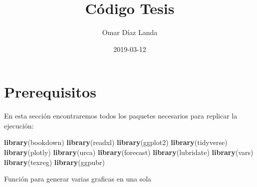 \documentclass[]{book}
\title{Código Tesis}
\author{Omar Díaz Landa}
\date{2019-03-12}
\newenvironment{Shaded}{\begin{snugshade}}{\end{snugshade}}
\newcommand{\KeywordTok}[1]{\textcolor[rgb]{0.13,0.29,0.53}{\textbf{#1}}}
\newcommand{\NormalTok}[1]{#1}
\theoremstyle{definition}
\theoremstyle{definition}
\theoremstyle{definition}
\theoremstyle{remark}
\begin{document}
\maketitle

{
\setcounter{tocdepth}{1}
\tableofcontents
}
\chapter{Prerequisitos}\label{prerequisitos}

En esta sección encontraremos todos los paquetes necesarios para
replicar la ejecución:

\begin{Shaded}
\begin{Highlighting}[]
\KeywordTok{library}\NormalTok{(bookdown)}
\KeywordTok{library}\NormalTok{(readxl)}
\KeywordTok{library}\NormalTok{(ggplot2)}
\KeywordTok{library}\NormalTok{(tidyverse)}
\KeywordTok{library}\NormalTok{(plotly)}
\KeywordTok{library}\NormalTok{(urca)}
\KeywordTok{library}\NormalTok{(forecast)}
\KeywordTok{library}\NormalTok{(lubridate)}
\KeywordTok{library}\NormalTok{(vars)}
\KeywordTok{library}\NormalTok{(texreg)}
\KeywordTok{library}\NormalTok{(ggpubr)}
\end{Highlighting}
\end{Shaded}

Función para generar varias graficas en una sola
\end{document}
